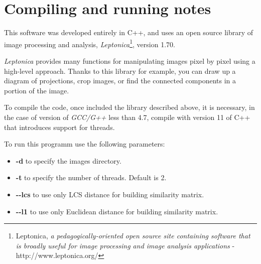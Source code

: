\section{Compiling and running notes}

This software was developed entirely in C++, and uses an open source library of image processing and analysis, \emph{Leptonica}\footnote{Leptonica, \emph{a pedagogically-oriented open source site containing software that is broadly useful for image processing and image analysis applications} -http://www.leptonica.org/}, version 1.70.

\emph{Leptonica} provides many functions for manipulating images pixel by pixel using a high-level approach. Thanks to this library for example, you can draw up a diagram of projections, crop images, or find the connected components in a portion of the image.

To compile the code, once included the library described above, it is necessary, in the case of version of \emph{GCC/G++} less than 4.7, compile with version 11 of C++ that introduces support for threads.

To run this programm use the following parameters:
\begin{itemize}
\item \textbf{-d} to specify the images directory.
\item \textbf{-t} to specify the number of threads. Default is 2.
\item \textbf{-\--lcs} to use only LCS distance for building similarity matrix.
\item \textbf{-\--l1} to use only Euclidean distance for building similarity matrix.
\end{itemize}